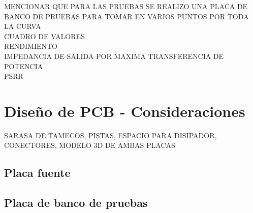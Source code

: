 MENCIONAR QUE PARA LAS PRUEBAS SE REALIZO UNA PLACA DE BANCO DE PRUEBAS PARA TOMAR EN VARIOS PUNTOS POR TODA LA CURVA\\
CUADRO DE VALORES\\
RENDIMIENTO\\
IMPEDANCIA DE SALIDA POR MAXIMA TRANSFERENCIA DE POTENCIA\\
PSRR\\



\section{Dise\~no de PCB - Consideraciones}

SARASA DE TAMECOS, PISTAS, ESPACIO PARA DISIPADOR, CONECTORES, MODELO 3D DE AMBAS PLACAS

\subsection{Placa fuente}

\subsection{Placa de banco de pruebas}

